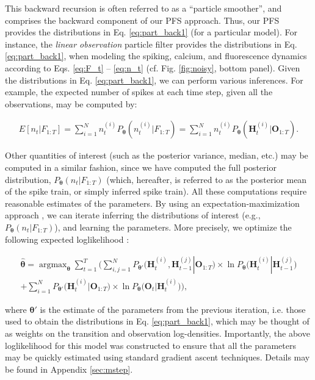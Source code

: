 \documentclass[10pt]{article}
\providecommand{\ve}[1]{\boldsymbol{#1}}
\providecommand{\ve}[1]{\boldsymbol{#1}}
\DeclareMathOperator*{\argmax}{argmax}
\newcommand{\thetn}{\ve{\theta}}
\newcommand{\theto}{\ve{\theta}'}
\newcommand{\p}{P_{\thetn}}
\begin{document}
\noindent This backward recursion is often referred to as a ``particle smoother'', and comprises the backward component of our PFS approach.  Thus, our PFS provides the distributions in Eq. \ref{eq:part_back1} (for a particular model).  For instance, the \emph{linear observation} particle filter provides the distributions in Eq. \ref{eq:part_back1}, when modeling the spiking, calcium, and fluorescence dynamics according to Eqs. \ref{eq:F_t} -- \ref{eq:n_t} (cf. Fig. \ref{fig:noisy}, bottom panel).  Given the distributions in Eq. \ref{eq:part_back1}, we can perform various inferences. For example, the expected number of spikes at each time step, given all the observations, may be computed by:

\begin{align}
E[n_t | F_{1:T}]=  \sum_{i=1}^N n_t^{(i)} \p(n_t^{(i)} | F_{1:T})=
\sum_{i=1}^N n_t^{(i)} \p(\ve{H}_t^{(i)} | \ve{O}_{1:T}). 
\end{align}

\noindent Other quantities of interest (such as the posterior variance, median, etc.) may be computed in a similar fashion, since we have computed the full posterior distribution, $\p(n_t | F_{1:T})$ (which, hereafter, is referred to as the posterior mean of the spike train, or simply inferred spike train). All these computations require reasonable estimates of the parameters. By using an expectation-maximization approach \cite{DempsterRubin77}, we can iterate inferring the distributions of interest (e.g., $\p(n_t | F_{1:T})$), and learning the parameters.  More precisely, we optimize the following expected loglikelihood \cite{WillsNinness08}:

\begin{multline} \label{eq:m_tot}
\widehat{\ve{\theta}} = \argmax_{\ve{\theta}} \sum_{t=1}^T \Bigg( \sum_{i,j=1}^N P_{\theto} \big(\ve{H}_t^{(i)}, \ve{H}_{t-1}^{(j)} | \ve{O}_{1:T}\big)\times \ln \p\big(\ve{H}_t^{(i)} | \ve{H}_{t-1}^{(j)}\big) \\ 
+ \sum_{i=1}^N  P_{\theto} \big(\ve{H}_t^{(i)} | \ve{O}_{1:T}\big) \times \ln \p\big(\ve{O}_t | \ve{H}_t^{(i)}\big)\Bigg), 
\end{multline}

\noindent where $\ve{\theta}'$ is the estimate of the parameters from the previous iteration, i.e. those used to obtain the distributions in Eq. \ref{eq:part_back1},  which may be thought of as weights on the transition and observation log-densities. Importantly, the above loglikelihood for this model was constructed to ensure that all the parameters may be quickly estimated using standard gradient ascent techniques.  %
Details may be found in Appendix \ref{sec:mstep}.
\end{document}
